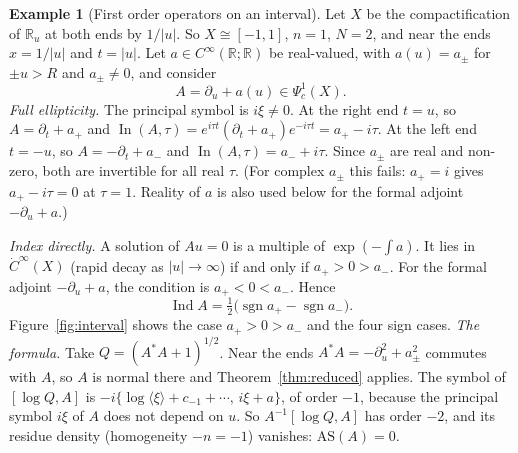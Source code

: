 \documentclass[11pt,oneside,reqno]{article}
\DeclareMathOperator{\Ind}{Ind}
\DeclareMathOperator{\In}{In}
\DeclareMathOperator{\sgn}{sgn}
\newcommand{\R}{\mathbb R}
\newcommand{\Psic}{\Psi_{c}}
\newcommand{\CI}{C^\infty}
\newcommand{\dCI}{\dot C^\infty}
\newcommand{\lQ}{\log Q}
\newcommand{\AS}{\mathrm{AS}}
\theoremstyle{plain}
\theoremstyle{definition}
\newtheorem{example}[theorem]{Example}
\theoremstyle{remark}
\begin{document}
\begin{example}[First order operators on an interval]\label{ex:interval-index}
Let \(X\) be the compactification of \(\R_u\) at both ends by \(1/|u|\).
So \(X\cong[-1,1]\), \(n=1\), \(N=2\), and near the ends \(x=1/|u|\) and
\(t=|u|\). Let \(a\in\CI(\R;\R)\) be real-valued, with \(a(u)=a_\pm\) for
\(\pm u>R\) and \(a_\pm\neq0\), and consider
\[
 A=\partial_u+a(u)\in\Psic^1(X).
\]
\emph{Full ellipticity.} The principal symbol is \(i\xi\ne0\). At the right
end \(t=u\), so \(A=\partial_t+a_+\) and \(\In(A,\tau)=e^{i\tau t}(\partial_t
+a_+)e^{-i\tau t}=a_+-i\tau\). At the left end \(t=-u\), so
\(A=-\partial_t+a_-\) and \(\In(A,\tau)=a_-+i\tau\). Since \(a_\pm\) are
real and non-zero, both are invertible for all real \(\tau\). (For complex
\(a_\pm\) this fails: \(a_+=i\) gives \(a_+-i\tau=0\) at \(\tau=1\). Reality
of \(a\) is also used below for the formal adjoint \(-\partial_u+a\).)

\emph{Index directly.} A solution of \(Au=0\) is a multiple of
\(\exp(-\int a)\). It lies in \(\dCI(X)\) (rapid decay as \(|u|\to\infty\))
if and only if \(a_+>0>a_-\). For the formal adjoint \(-\partial_u+a\), the
condition is \(a_+<0<a_-\). Hence
\[
 \Ind A=\tfrac12\bigl(\sgn a_+-\sgn a_-\bigr).
\]
Figure~\ref{fig:interval} shows the case \(a_+>0>a_-\) and the four sign
cases.
\emph{The formula.} Take \(Q=(A^*A+1)^{1/2}\). Near the ends
\(A^*A=-\partial_u^2+a_\pm^2\) commutes with \(A\), so \(A\) is normal
there and Theorem~\ref{thm:reduced} applies. The symbol of \([\lQ,A]\) is
\(-i\{\log\langle\xi\rangle+c_{-1}+\cdots,\,i\xi+a\}\), of order \(-1\),
because the principal symbol \(i\xi\) of \(A\) does not depend on \(u\).
So \(A^{-1}[\lQ,A]\) has order \(-2\), and its residue density
(homogeneity \(-n=-1\)) vanishes: \(\AS(A)=0\).


\end{example}
\end{document}
